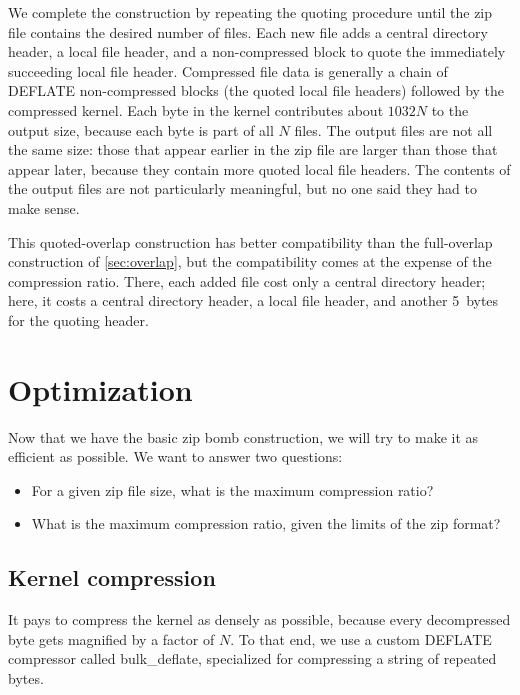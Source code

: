 \documentclass[letterpaper,twocolumn,10pt]{article}
\newcommand{\bulkdeflate}{\mbox{bulk\_deflate}}
\begin{document}
We complete the construction by repeating the quoting procedure
until the zip file contains the desired number of files.
Each new file adds a central directory header,
a local file header,
and a non-compressed block to quote the immediately succeeding local file header.
Compressed file data is generally a chain of DEFLATE non-compressed blocks
(the quoted local file headers)
followed by the compressed kernel.
Each byte in the kernel contributes about
$\num{1032}N$ to the output size,
because each byte is part of all $N$ files.
The output files are not all the same size:
those that appear earlier in the zip file
are larger than those that appear later,
because they contain more quoted local file headers.
The contents of the output files are not particularly meaningful,
but no one said they had to make sense.

This quoted-overlap construction has better compatibility
than the full-overlap construction of \autoref{sec:overlap},
but the compatibility comes at the expense of the compression ratio.
There, each added file cost only a central directory header;
here, it costs a central directory header,
a local file header,
and another \SI{5}{bytes} for the quoting header.


\section{Optimization}
\label{sec:optimization}

Now that we have the basic zip bomb construction,
we will try to make it as efficient as possible.
We want to answer two questions:

\begin{itemize}
\item For a given zip file size, what is the maximum compression ratio?
\item What is the maximum compression ratio, given the limits of the zip format?
\end{itemize}

\subsection{Kernel compression}
\label{sec:bulkdeflate}

It pays to compress the kernel as densely as possible,
because every decompressed byte gets magnified by a factor of $N$.
To that end, we use a custom DEFLATE compressor
called \bulkdeflate,
specialized for compressing
a string of repeated bytes.
\end{document}
